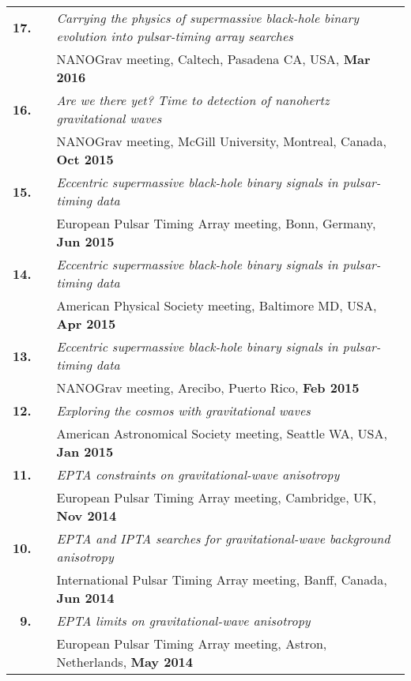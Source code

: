\documentclass[11pt,letterpaper,sans]{moderncv}
\begin{document}
{\begin{longtable}{rp{0.3cm}p{15.8cm}}
\textbf{17.} & & \textit{Carrying the physics of supermassive black-hole binary evolution into pulsar-timing array searches} \\ 
&& NANOGrav meeting, Caltech, Pasadena CA, USA, \textbf{Mar 2016} \vspace{0.09cm}\\
\textbf{16.} & & \textit{Are we there yet? Time to detection of nanohertz gravitational waves} \\ 
&& NANOGrav meeting, McGill University, Montreal, Canada, \textbf{Oct 2015} \vspace{0.09cm}\\
\textbf{15.} & & \textit{Eccentric supermassive black-hole binary signals in pulsar-timing data} \\ 
&& European Pulsar Timing Array meeting, Bonn, Germany, \textbf{Jun 2015} \vspace{0.09cm}\\
\textbf{14.} & & \textit{Eccentric supermassive black-hole binary signals in pulsar-timing data} \\ 
&& American Physical Society meeting, Baltimore MD, USA, \textbf{Apr 2015} \vspace{0.09cm}\\
\textbf{13.} & & \textit{Eccentric supermassive black-hole binary signals in pulsar-timing data} \\ 
&& NANOGrav meeting, Arecibo, Puerto Rico, \textbf{Feb 2015} \vspace{0.09cm}\\
\textbf{12.} & & \textit{Exploring the cosmos with gravitational waves} \\ 
&& American Astronomical Society meeting, Seattle WA, USA, \textbf{Jan 2015} \vspace{0.09cm}\\
\textbf{11.} & & \textit{EPTA constraints on gravitational-wave anisotropy} \\ 
&& European Pulsar Timing Array meeting, Cambridge, UK, \textbf{Nov 2014} \vspace{0.09cm}\\
\textbf{10.} & & \textit{EPTA and IPTA searches for gravitational-wave background anisotropy} \\ 
&& International Pulsar Timing Array meeting, Banff, Canada, \textbf{Jun 2014} \vspace{0.09cm}\\
\textbf{9.} & & \textit{EPTA limits on gravitational-wave anisotropy} \\ 
&& European Pulsar Timing Array meeting, Astron, Netherlands, \textbf{May 2014} \vspace{0.09cm}\\

\end{longtable}}
\end{document}
